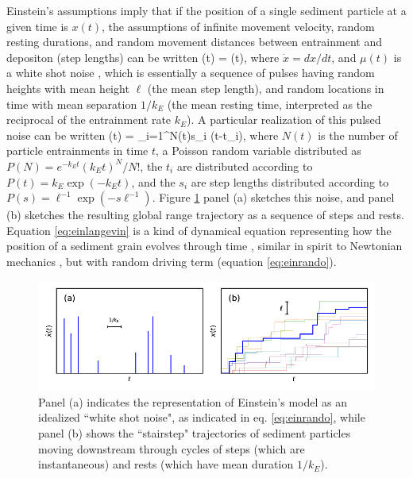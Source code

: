 Einstein's assumptions imply that if the position of a single sediment particle at a given time is $x(t)$, the assumptions of infinite movement velocity, random resting durations, and random movement distances between entrainment and depositon (step lengths) can be written
\be {}(t) = \mu(t), \label{eq:einlangevin}\ee
where $\dot{x} = dx/dt$, and $\mu(t)$ is a white shot noise \citep{VanDenBroeck1983}, which is essentially a sequence of pulses having random heights with mean height $\ell$ (the mean step length), and random locations in time with mean separation $1/k_E$ (the mean resting time, interpreted as the reciprocal of the entrainment rate $k_E$).
A particular realization of this pulsed noise can be written
\be \mu(t) = \sum_{i=1}^{N(t)}s_i \delta(t-t_i), \label{eq:einrando} \ee
where $N(t)$ is the number of particle entrainments in time $t$, a Poisson random variable distributed as $P(N) = e^{-k_E t} (k_E t)^N/N!$, the $t_i$ are distributed according to $P(t) = k_E\exp(-k_E t)$, and the $s_i$ are step lengths distributed according to $P(s) = \ell^{-1}\exp(-s \ell^{-1}).$
Figure \ref{fig:einsteinfig} panel (a) sketches this noise, and panel (b) sketches the resulting global range trajectory as a sequence of steps and rests.
Equation \ref{eq:einlangevin} is a kind of dynamical equation representing how the position of a sediment grain evolves through time \citep{Kubo1978}, similar in spirit to Newtonian mechanics \citep{Goldstein1997}, but with random driving term (equation \ref{eq:einrando}).
\begin{figure}[!htbp]
	\includegraphics[width=\linewidth,keepaspectratio]{./figures/ch1/einsteinConcept.pdf}
	\caption{Panel (a) indicates the representation of Einstein's model as an idealized ``white shot noise", as indicated in eq. \ref{eq:einrando}, while panel (b) shows the ``stairstep" trajectories of sediment particles moving downstream through cycles of steps (which are instantaneous) and rests (which have mean duration $1/k_E$). }
	\label{fig:einsteinfig}
\end{figure}

